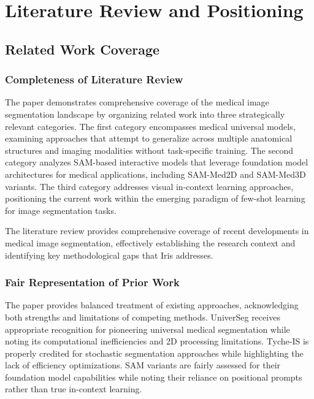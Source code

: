 \section{Literature Review and Positioning}
\label{sec:literature_review}

\subsection{Related Work Coverage}
\subsubsection{Completeness of Literature Review}
The paper demonstrates comprehensive coverage of the medical image segmentation landscape by organizing related work into three strategically relevant categories. The first category encompasses medical universal models, examining approaches that attempt to generalize across multiple anatomical structures and imaging modalities without task-specific training. The second category analyzes SAM-based interactive models that leverage foundation model architectures for medical applications, including SAM-Med2D and SAM-Med3D variants. The third category addresses visual in-context learning approaches, positioning the current work within the emerging paradigm of few-shot learning for image segmentation tasks.

The literature review provides comprehensive coverage of recent developments in medical image segmentation, effectively establishing the research context and identifying key methodological gaps that Iris addresses.

\subsubsection{Fair Representation of Prior Work}
The paper provides balanced treatment of existing approaches, acknowledging both strengths and limitations of competing methods. UniverSeg receives appropriate recognition for pioneering universal medical segmentation while noting its computational inefficiencies and 2D processing limitations. Tyche-IS is properly credited for stochastic segmentation approaches while highlighting the lack of efficiency optimizations. SAM variants are fairly assessed for their foundation model capabilities while noting their reliance on positional prompts rather than true in-context learning.

